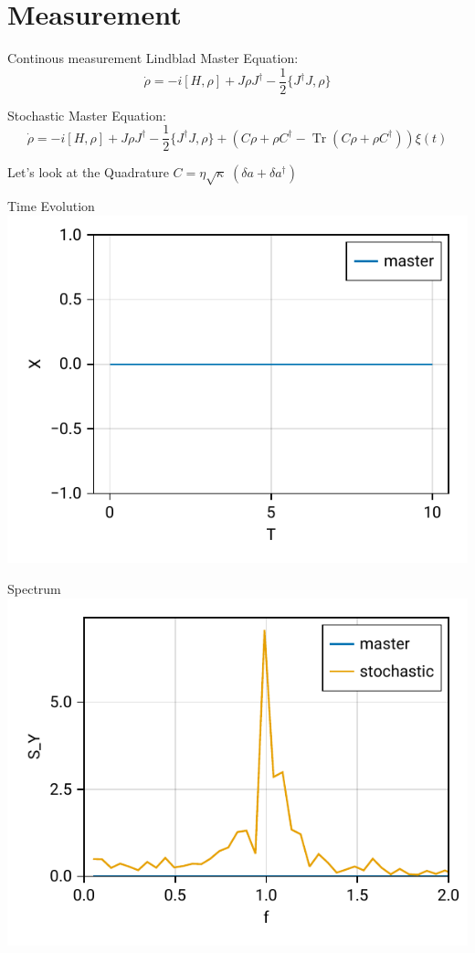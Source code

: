 \documentclass{beamer}
\DeclareMathOperator{\Tr}{Tr}
\begin{document}
\section{Measurement}
\begin{frame}{Continous measurement}
	\textcolor{seegrau}{
		Lindblad Master Equation:
		$$\dot\rho = -i[H,\rho] + J\rho J^\dagger - \frac{1}{2} \{J^\dagger J, \rho\}$$
	}

	Stochastic Master Equation:
	$$
		\dot\rho 
		= -i[H,\rho] 
		+ J\rho J^\dagger - \frac{1}{2} \{J^\dagger J, \rho\} 
		+ \left(C\rho + \rho C^\dagger - \Tr(C\rho + \rho C^\dagger)\right)\xi(t)
	$$

	Let's look at the Quadrature $C = \eta\sqrt{\kappa}\;(\delta a + \delta a^\dagger)$

\end{frame}

\begin{frame}{Time Evolution}
	\centering
	\includegraphics{figures/01 time evolution.pdf}
\end{frame}

\begin{frame}{Spectrum}
	\centering
	\includegraphics{figures/01 time evolution spectrum.pdf}
\end{frame}
\end{document}
